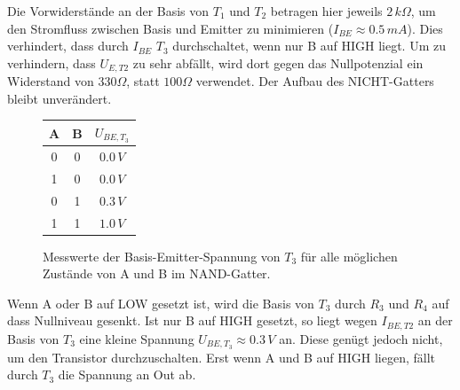 Die Vorwiderstände an der Basis von $T_1$ und $T_2$ betragen hier jeweils $2\,k\Omega$, um den Stromfluss zwischen Basis und Emitter zu minimieren ($I_{BE} \approx 0.5\,mA$). Dies verhindert, dass durch $I_{BE}$ $T_3$ durchschaltet, wenn nur B auf HIGH liegt. Um zu verhindern, dass $U_{E,T2}$ zu sehr abfällt, wird dort gegen das Nullpotenzial ein Widerstand von $330\Omega$, statt $100\Omega$ verwendet. Der Aufbau des NICHT-Gatters bleibt unverändert.
\newpage
\begin{figure}[!h]
	\centering
	\hspace{1cm}
	\begin{tabular}{|c|c|c|}
		\hline
		\textbf{A} & \textbf{B} & $U_{BE,T_3}$ \\
		\hline
		0 & 0 & $0.0\,V$ \\
		1 & 0 & $0.0\,V$ \\
		0 & 1 & $0.3\,V$ \\
		1 & 1 & $1.0\,V$ \\
		\hline
	\end{tabular}
	\caption{Messwerte der Basis-Emitter-Spannung von $T_3$ für alle möglichen Zustände von A und B im NAND-Gatter.}
\end{figure}
Wenn A oder B auf LOW gesetzt ist, wird die Basis von $T_3$ durch $R_3$ und $R_4$ auf dass Nullniveau gesenkt. Ist nur B auf HIGH gesetzt, so liegt wegen $I_{BE,T2}$ an der Basis von $T_3$ eine kleine Spannung $U_{BE,T_3} \approx 0.3\,V$ an. Diese genügt jedoch nicht, um den Transistor durchzuschalten. Erst wenn A und B auf HIGH liegen, fällt durch $T_3$ die Spannung an Out ab.\\
